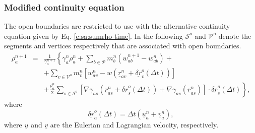 \documentclass[12pt]{memoir}
\newcommand{\uvec}[1]{\underline{#1}}
\newcommand{\sumP}{\underset{b \in \mathcal{P}}{\sum}}
\begin{document}
\subsubsection{Modified continuity equation}
The open boundaries are restricted to use with the alternative
continuity equation given by Eq. \eqref{e:sa:sumrho-time}. In the
following $\mathcal{S}^o$ and $\mathcal{V}^o$ denote the segments and
vertices respectively that are associated with open boundaries.
\begin{eqnarray}
\rho_a^{n+1} &=& \frac{1}{\gamma_a^{n+1}}\left\{ \gamma_a^n \rho_a^n +
\sumP m_b^n (w_{ab}^{n+1} - w_{ab}^n) + \right.
\label{e:open:sumrho-time}
\\
&&\left. + \underset{v\in\mathcal{V}^o}{\sum}m_v^n\left[ w_{av}^n -
w\left( \uvec{r}_{av}^n + \uvec{\delta r}_v^o(\Delta t) \right) \right]\right.
\nonumber
\\
&&\left. + \frac{\rho_a^n}{2}\underset{s\in\mathcal{S}^o}{\sum}\left[
\nabla\gamma_{as}\left(\uvec{r}_{as}^n + \uvec{\delta r}_s^o(\Delta t)\right) +
\nabla\gamma_{as}(\uvec{r}_{as}^n)
\right]\cdot\uvec{\delta r}_s^o(\Delta t)\right\},
\nonumber
\end{eqnarray}
where
\begin{equation}
\uvec{\delta r}_a^o(\Delta t) = \Delta t (\uvec{u}_a^n + \uvec{v}_a^n),
\label{e:open:deltar}
\end{equation}
where $\uvec{u}$ and $\uvec{v}$ are the Eulerian and Lagrangian
velocity, respectively.
\end{document}
